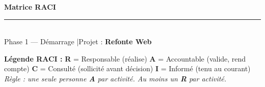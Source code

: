 \documentclass[11pt,a4paper,oneside]{report}
\begin{document}
\small

\begin{center}
{\LARGE\bfseries\color{cnNavy} Matrice RACI}\\[4pt]
\textcolor{cnOrange}{\rule{10cm}{1pt}}\\[4pt]
{\large\color{cnSlate} Phase 1 — Démarrage \quad|\quad Projet : \textbf{Refonte Web}}
\end{center}

\vspace{6pt}

\begin{finding}
\textbf{Légende RACI :}
\textbf{R} = Responsable (réalise) \quad
\textbf{A} = Accountable (valide, rend compte) \quad
\textbf{C} = Consulté (sollicité avant décision) \quad
\textbf{I} = Informé (tenu au courant)\\
\textit{Règle : une seule personne \textbf{A} par activité. Au moins un \textbf{R} par activité.}
\end{finding}

\vspace{6pt}
\end{document}
